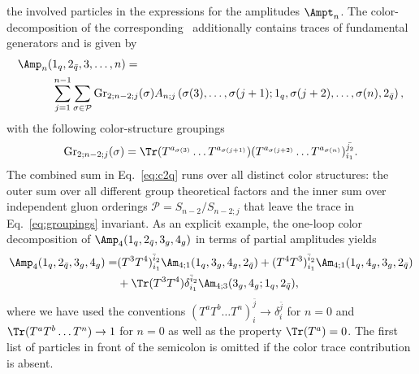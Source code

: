 the involved particles in the expressions for the amplitudes
$\Ampt_n$. The color-decomposition of the corresponding
\ola~additionally contains traces of fundamental generators and is given by
\begin{align}\label{eq:c2q}
  \begin{split}
  \Amp_n  (&1_q,2_{\bar q},3,\dots,n)=\\
&  \sum_{j=1}^{n-1}\sum_{\substack{\sigma \in \mathcal{P}\\}}
  \text{Gr}_{2;n-2;j}(\sigma)A_{n;j}\left(\sigma(3),\dots,\sigma(j+1);1_q,\sigma(j+2),\dots,\sigma(n),2_{\bar
  q}\right),
\end{split}
\end{align}
with the following color-structure groupings
\begin{align}\label{eq:groupings}
   \text{Gr}_{2;n-2;j}(\sigma) = \Tr(T^{a_{\sigma(3)}} \dots
 T^{a_{\sigma(j+1)}})(T^{a_{\sigma(j+2)}} \dots
 T^{a_{\sigma(n)}})_{i_1}^{\bar{j_2}}.
\end{align}
The combined sum in Eq.~\eqref{eq:c2q} runs over all distinct color
structures: the outer sum over all different group
theoretical factors and the inner sum over independent gluon orderings
$\mathcal{P}=S_{n-2}/S_{n-2;j}$ that leave the trace in
Eq.~\eqref{eq:groupings} invariant. As an explicit example, the one-loop color
decomposition of $\Amp_4(1_q,2_{\bar q},3_g,4_g)$ in terms of partial amplitudes yields
\begin{align}\label{eq:partialdecomp}
\begin{split}
  \Amp_4(1_q,2_{\bar q},3_g,4_g) =&
  (T^3T^4)_{i_1}^{\bar{i}_2}\Am_{4;1}(1_q,3_g,4_g,2_{\bar q})+
  (T^4T^3)_{i_1}^{\bar{i}_2}\Am_{4;1}(1_q,4_g,3_g,2_{\bar
    q})\\
&+\Tr(T^3T^4)\delta_{i_1}^{\bar{i}_2}\Am_{4;3}(3_g,4_g;1_q,2_{\bar q}),
\end{split}
\end{align}
where we have used the conventions $(T^aT^b\dots T^n)_i^{\bar
  j} \rightarrow \delta_i^{\bar j}$ for $n=0$ and $\Tr(T^aT^b\dots
 T^n) \rightarrow 1$ for $n=0$ as well as the property $\Tr (T^a) =
 0$. The first list of particles in front of the semicolon is omitted if the color trace contribution is absent.


